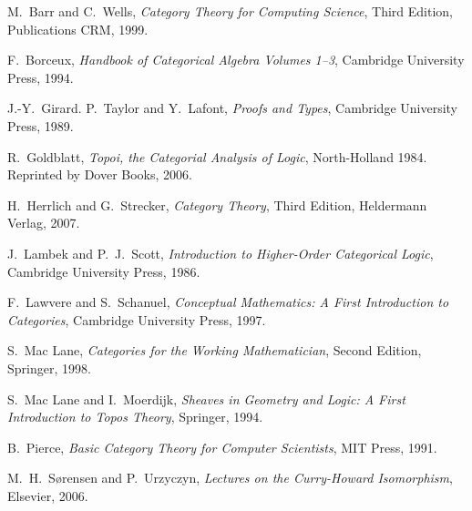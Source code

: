 \documentclass[12pt]{article}
\begin{document}

\begin{thebibliography}{99}


M.~Barr and C.~Wells, \textsl{Category Theory for Computing Science}, Third Edition, Publications CRM, 1999.

F.~Borceux, \textsl{Handbook of Categorical Algebra Volumes 1--3}, Cambridge University Press, 1994.

J.-Y.~Girard. P.~Taylor and Y.~Lafont, \textsl{Proofs and Types}, Cambridge University Press, 1989.

R.~Goldblatt, \textsl{Topoi, the Categorial Analysis of Logic}, North-Holland 1984. Reprinted by Dover Books, 2006.

H.~Herrlich and G.~Strecker, \textsl{Category Theory}, Third Edition, Heldermann Verlag, 2007.

J.~Lambek and P.~J.~Scott, \textsl{Introduction to Higher-Order Categorical Logic}, Cambridge University Press, 1986.

F.~Lawvere and S.~Schanuel, \textsl{Conceptual Mathematics: A First Introduction to Categories}, Cambridge University Press, 1997.

S.~Mac Lane, \textsl{Categories for the Working Mathematician}, Second Edition, Springer, 1998.

S.~Mac Lane and I.~Moerdijk, \textsl{Sheaves in Geometry and Logic: A First Introduction to Topos Theory}, Springer, 1994.

B.~Pierce, \textsl{Basic Category Theory for Computer Scientists}, MIT Press, 1991.

M.~H.~S{\o}rensen and P.~Urzyczyn, \textsl{Lectures on the Curry-Howard Isomorphism}, Elsevier, 2006.

\end{thebibliography}
\end{document}
